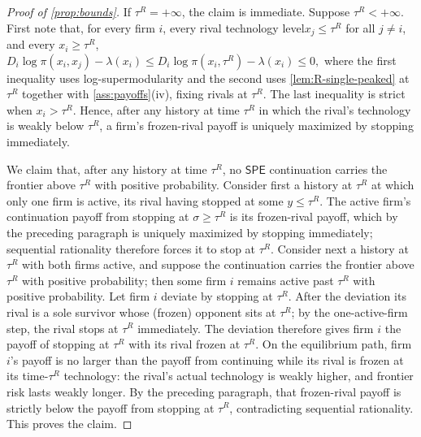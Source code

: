 \documentclass[12pt,reqno]{article}
\newcommand{\SPE}{\ensuremath{\mathsf{SPE}}}
\theoremstyle{definition} \newtheorem{example}{Example}
\theoremstyle{definition} \newtheorem{condition}{Condition}
\theoremstyle{definition} \newtheorem{corollary}{Corollary}
\theoremstyle{definition} \newtheorem{claim}{Claim}
\theoremstyle{definition} \newtheorem{definition}{Definition}
\theoremstyle{definition} \newtheorem{conjecture}{Conjecture}
\theoremstyle{definition} \newtheorem{Lemma}{Lemma}
\theoremstyle{definition} \newtheorem{lemma}{Lemma}
\theoremstyle{plain} \newtheorem{theorem}{Theorem}
\theoremstyle{definition} \newtheorem{assumption}{Assumption}
\theoremstyle{definition} \newtheorem*{assumptionnonumber}{Assumption}
\theoremstyle{definition} \newtheorem*{theoremNoNumber}{Proposition}
\theoremstyle{definition}
\theoremstyle{definition}\newtheorem{proposition}{Proposition}
\theoremstyle{definition} \newtheorem{result}{Result}
\theoremstyle{definition} \newtheorem*{definitionNoNumber}{Definition}
\theoremstyle{definition} \newtheorem{Definition}{Definition}
\theoremstyle{definition} \newtheorem*{DefinitionNoNumber}{Definition}
\theoremstyle{definition} \newtheorem*{fact}{Fact}
\theoremstyle{definition} \newtheorem*{property}{Property}
\theoremstyle{definition} \newtheorem{remark}{Remark}
\begin{document}
\begin{proof}[Proof of \cref{prop:bounds}]
If $\tau^R=+\infty$, the claim is immediate. Suppose $\tau^R<+\infty$. First note that, for every firm $i$, every rival technology level$x_j\leq\tau^R$ for all $j\neq i$, and every $x_i\geq\tau^R$,
$
D_i\log\pi(x_i,x_j)-\lambda(x_i)
\leq
D_i\log\pi(x_i,\tau^R)-\lambda(x_i) \leq 0,$ 
where the first inequality uses log-supermodularity and the second uses \cref{lem:R-single-peaked} at $\tau^R$ together with \cref{ass:payoffs}(iv), fixing rivals at $\tau^R$. The last inequality is strict when $x_i>\tau^R$. Hence, after any history at time $\tau^R$ in which the rival's technology is weakly below $\tau^R$, a firm's frozen-rival payoff is uniquely maximized by stopping immediately.

We claim that, after any history at time $\tau^R$, no $\SPE$ continuation carries the frontier above $\tau^R$ with positive probability. Consider first a history at $\tau^R$ at which only one firm is active, its rival having stopped at some $y\le\tau^R$. The active firm's continuation payoff from stopping at $\sigma\ge\tau^R$ is its frozen-rival payoff, which by the preceding paragraph is uniquely maximized by stopping immediately; sequential rationality therefore forces it to stop at $\tau^R$. Consider next a history at $\tau^R$ with both firms active, and suppose the continuation carries the frontier above $\tau^R$ with positive probability; then some firm $i$ remains active past $\tau^R$ with positive probability. Let firm $i$ deviate by stopping at $\tau^R$. After the deviation its rival is a sole survivor whose (frozen) opponent sits at $\tau^R$; by the one-active-firm step, the rival stops at $\tau^R$ immediately. The deviation therefore gives firm $i$  the payoff of stopping at $\tau^R$ with its rival frozen at $\tau^R$. On the equilibrium path, firm $i$'s payoff is no larger than the payoff from continuing while its rival is frozen at its time-$\tau^R$ technology: the rival's actual technology is weakly higher, and frontier risk lasts weakly longer. By the preceding paragraph, that frozen-rival payoff is strictly below the payoff from stopping at $\tau^R$, contradicting sequential rationality. This proves the claim.


\end{proof}
\end{document}
